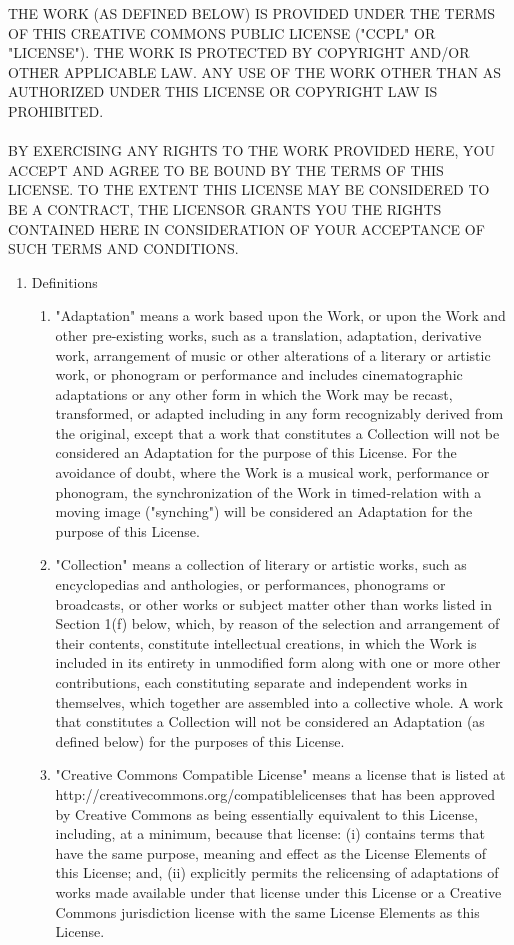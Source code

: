 \documentclass{article}
\begin{document}
{\tiny THE WORK (AS DEFINED BELOW) IS PROVIDED UNDER THE TERMS OF THIS CREATIVE COMMONS PUBLIC LICENSE ("CCPL" OR "LICENSE"). THE WORK IS PROTECTED BY COPYRIGHT AND/OR OTHER APPLICABLE LAW. ANY USE OF THE WORK OTHER THAN AS AUTHORIZED UNDER THIS LICENSE OR COPYRIGHT LAW IS PROHIBITED.\\
\\
BY EXERCISING ANY RIGHTS TO THE WORK PROVIDED HERE, YOU ACCEPT AND AGREE TO BE BOUND BY THE TERMS OF THIS LICENSE. TO THE EXTENT THIS LICENSE MAY BE CONSIDERED TO BE A CONTRACT, THE LICENSOR GRANTS YOU THE RIGHTS CONTAINED HERE IN CONSIDERATION OF YOUR ACCEPTANCE OF SUCH TERMS AND CONDITIONS.\\
\begin{enumerate}
	\item Definitions
	\begin{enumerate}
		\item "Adaptation" means a work based upon the Work, or upon the Work and other pre-existing works, such as a translation, adaptation, derivative work, arrangement of music or other alterations of a literary or artistic work, or phonogram or performance and includes cinematographic adaptations or any other form in which the Work may be recast, transformed, or adapted including in any form recognizably derived from the original, except that a work that constitutes a Collection will not be considered an Adaptation for the purpose of this License. For the avoidance of doubt, where the Work is a musical work, performance or phonogram, the synchronization of the Work in timed-relation with a moving image ("synching") will be considered an Adaptation for the purpose of this License.
		\item "Collection" means a collection of literary or artistic works, such as encyclopedias and anthologies, or performances, phonograms or broadcasts, or other works or subject matter other than works listed in Section 1(f) below, which, by reason of the selection and arrangement of their contents, constitute intellectual creations, in which the Work is included in its entirety in unmodified form along with one or more other contributions, each constituting separate and independent works in themselves, which together are assembled into a collective whole. A work that constitutes a Collection will not be considered an Adaptation (as defined below) for the purposes of this License.
		\item "Creative Commons Compatible License" means a license that is listed at http://creativecommons.org/compatiblelicenses that has been approved by Creative Commons as being essentially equivalent to this License, including, at a minimum, because that license: (i) contains terms that have the same purpose, meaning and effect as the License Elements of this License; and, (ii) explicitly permits the relicensing of adaptations of works made available under that license under this License or a Creative Commons jurisdiction license with the same License Elements as this License.

\end{enumerate}
\end{enumerate}}
\end{document}
